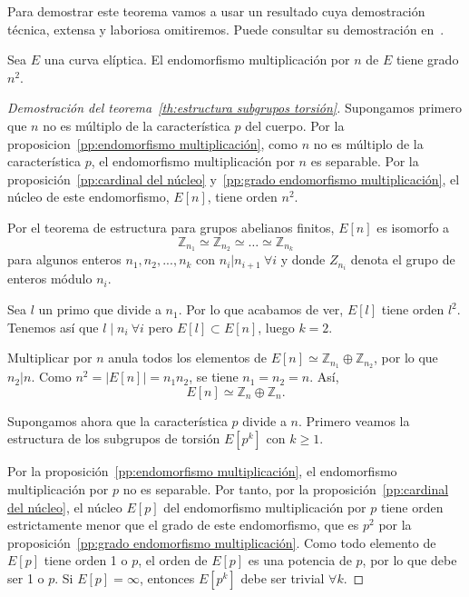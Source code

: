 Para demostrar este teorema vamos a usar un resultado cuya demostración técnica, extensa y laboriosa omitiremos. Puede consultar su demostración en~\cite[sec. 3.2]{Washington:2008}.

\begin{proposicion}\label{pp:grado endomorfismo multiplicación}
	Sea $E$ una curva elíptica. El endomorfismo multiplicación por $n$ de $E$ tiene grado $n^2$.
\end{proposicion}

\begin{proof}[Demostración del teorema~\ref{th:estructura subgrupos torsión}]
Supongamos primero que $n$ no es múltiplo de la característica $p$ del cuerpo. Por la proposicion~\ref{pp:endomorfismo multiplicación}, como $n$ no es múltiplo de la característica $p$, el endomorfismo multiplicación por $n$ es separable. Por la proposición~\ref{pp:cardinal del núcleo} y~\ref{pp:grado endomorfismo multiplicación}, el núcleo de este endomorfismo, $E[n]$, tiene orden $n^2$.

Por el teorema de estructura para grupos abelianos finitos, $E[n]$ es isomorfo a
$$
	\mathbb{Z}_{n_1} \simeq \mathbb{Z}_{n_2} \simeq \ldots \simeq \mathbb{Z}_{n_k}
$$
para algunos enteros $n_1, n_2, ..., n_k$ con $n_i | n_{i+1} \ \forall i$ y donde $Z_{n_i}$ denota el grupo de enteros módulo $n_i$.

Sea $l$ un primo que divide a $n_1$. Por lo que acabamos de ver, $E[l]$ tiene orden $l^2$. Tenemos así que $l \mid n_i \ \forall i$ pero $E[l] \subset E[n]$, luego $k = 2$.

Multiplicar por $n$ anula todos los elementos de $E[n] \simeq \mathbb{Z}_{n_1} \oplus \mathbb{Z}_{n_2}$, por lo que $n_2 | n$. Como $n^2 = \left\vert{E[n] }\right\vert = n_1 n_2$, se tiene $n_1 = n_2 = n$. Así,
$$
	E[n] \simeq \mathbb{Z}_n \oplus \mathbb{Z}_n.
$$

Supongamos ahora que la característica $p$ divide a $n$. Primero veamos la estructura de los subgrupos de torsión $E[p^k]$ con $k \ge 1$.

Por la proposición~\ref{pp:endomorfismo multiplicación}, el endomorfismo multiplicación por $p$ no es separable. Por tanto, por la proposición~\ref{pp:cardinal del núcleo}, el núcleo $E[p]$ del endomorfismo multiplicación por $p$ tiene orden estrictamente menor que el grado de este endomorfismo, que es $p^2$ por la proposición~\ref{pp:grado endomorfismo multiplicación}. Como todo elemento de $E[p]$ tiene orden 1 o $p$, el orden de $E[p]$ es una potencia de $p$, por lo que debe ser 1 o $p$. Si $E[p] = {\infty}$, entonces $E[p^k]$ debe ser trivial $\forall k$.


\end{proof}
